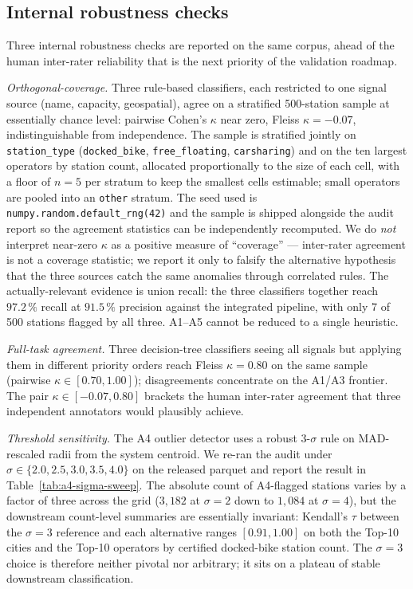 \documentclass[11pt,a4paper]{article}
\begin{document}
\subsection{Internal robustness checks}\label{secInternal}
Three internal robustness checks are reported on the same corpus,
ahead of the human inter-rater reliability that is the next
priority of the validation roadmap.

\emph{Orthogonal-coverage.}
Three rule-based classifiers, each restricted to one signal source
(name, capacity, geospatial), agree on a stratified
500-station sample at essentially chance level: pairwise Cohen's
$\kappa$ near zero, Fleiss $\kappa = -0.07$, indistinguishable
from independence. The sample is stratified jointly on
\texttt{station\_type} (\texttt{docked\_bike},
\texttt{free\_floating}, \texttt{carsharing}) and on the ten
largest operators by station count, allocated proportionally to
the size of each cell, with a floor of $n=5$ per stratum to keep
the smallest cells estimable; small operators are pooled into an
\texttt{other} stratum. The seed used is
\texttt{numpy.random.default\_rng(42)} and the sample is shipped
alongside the audit report so the agreement statistics can be
independently recomputed. We do
\emph{not} interpret near-zero $\kappa$ as a positive measure of
``coverage'' --- inter-rater agreement is not a coverage statistic;
we report it only to falsify the alternative hypothesis that the
three sources catch the same anomalies through correlated rules.
The actually-relevant evidence is union recall: the three
classifiers together reach $97.2\,\%$ recall at $91.5\,\%$
precision against the integrated pipeline, with only 7 of 500
stations flagged by all three. A1--A5 cannot be reduced to a
single heuristic.

\emph{Full-task agreement.}
Three decision-tree classifiers seeing all signals but applying them
in different priority orders reach Fleiss $\kappa = 0.80$ on the
same sample (pairwise $\kappa \in [0.70, 1.00]$); disagreements
concentrate on the A1/A3 frontier. The pair
$\kappa \in [-0.07, 0.80]$ brackets the human inter-rater agreement
that three independent annotators would plausibly achieve.

\emph{Threshold sensitivity.}
The A4 outlier detector uses a robust 3-$\sigma$ rule on
MAD-rescaled radii from the system centroid. We re-ran the audit
under $\sigma \in \{2.0, 2.5, 3.0, 3.5, 4.0\}$ on the released
parquet and report the result in
Table~\ref{tab:a4-sigma-sweep}. The absolute count of A4-flagged
stations varies by a factor of three across the grid
($3{,}182$ at $\sigma = 2$ down to $1{,}084$ at $\sigma = 4$), but
the downstream count-level summaries are essentially invariant:
Kendall's $\tau$ between the $\sigma = 3$ reference and each
alternative ranges $[0.91, 1.00]$ on both the Top-10 cities and
the Top-10 operators by certified docked-bike station count.
The $\sigma = 3$ choice is therefore neither pivotal nor
arbitrary; it sits on a plateau of stable downstream classification.
\end{document}
